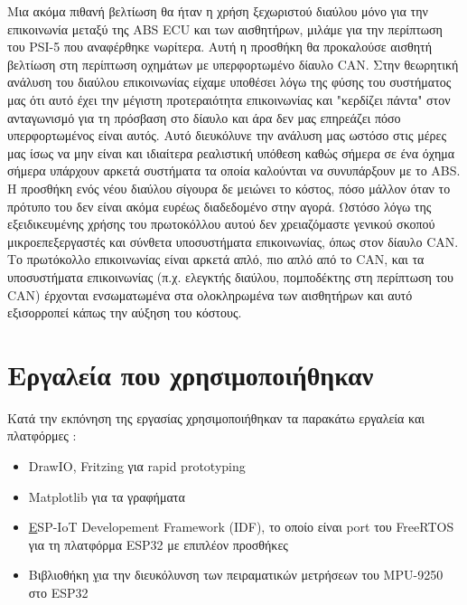\documentclass{article}
\begin{document}
Μια ακόμα πιθανή βελτίωση θα ήταν η χρήση ξεχωριστού διαύλου μόνο για την επικοινωνία μεταξύ της ABS ECU και των αισθητήρων, μιλάμε για την περίπτωση του PSI-5 που αναφέρθηκε νωρίτερα. Αυτή η προσθήκη θα προκαλούσε αισθητή βελτίωση στη περίπτωση οχημάτων με υπερφορτωμένο δίαυλο CAN. Στην θεωρητική ανάλυση του διαύλου επικοινωνίας είχαμε υποθέσει λόγω της φύσης του συστήματος μας ότι αυτό έχει την μέγιστη προτεραιότητα επικοινωνίας και "κερδίζει πάντα" στον ανταγωνισμό για τη πρόσβαση στο δίαυλο και άρα δεν μας επηρεάζει πόσο υπερφορτωμένος είναι αυτός. Αυτό διευκόλυνε την ανάλυση μας ωστόσο στις μέρες μας ίσως να μην είναι και ιδιαίτερα ρεαλιστική υπόθεση καθώς σήμερα σε ένα όχημα σήμερα υπάρχουν αρκετά συστήματα τα οποία καλούνται να συνυπάρξουν με το ABS. Η προσθήκη ενός νέου διαύλου σίγουρα δε μειώνει το κόστος, πόσο μάλλον όταν το πρότυπο του δεν είναι ακόμα ευρέως διαδεδομένο στην αγορά. Ωστόσο λόγω της εξειδικευμένης χρήσης του πρωτοκόλλου αυτού δεν χρειαζόμαστε γενικού σκοπού μικροεπεξεργαστές και σύνθετα υποσυστήματα επικοινωνίας, όπως στον δίαυλο CAN. Το πρωτόκολλο επικοινωνίας είναι αρκετά απλό, πιο απλό από το CAN, και τα υποσυστήματα επικοινωνίας (π.χ. ελεγκτής διαύλου, πομποδέκτης στη περίπτωση του CAN) έρχονται ενσωματωμένα στα ολοκληρωμένα των αισθητήρων και αυτό εξισορροπεί κάπως την αύξηση του κόστους.

\section{Εργαλεία που χρησιμοποιήθηκαν}
Κατά την εκπόνηση της εργασίας χρησιμοποιήθηκαν τα παρακάτω εργαλεία και πλατφόρμες :
\begin{itemize}
\item DrawIO, Fritzing για rapid prototyping
\item Matplotlib για τα γραφήματα
\item \href{https://docs.espressif.com/projects/esp-idf/en/latest/esp32/} ESP-IoT Developement Framework (IDF), το οποίο είναι port του FreeRTOS για τη πλατφόρμα ESP32 με επιπλέον προσθήκες
\item Βιβλιοθήκη \href{https://github.com/natanaeljr/esp32-MPU-driver} για την διευκόλυνση των πειραματικών μετρήσεων του MPU-9250 στο ESP32
\end{itemize}

\newpage



\end{document}
